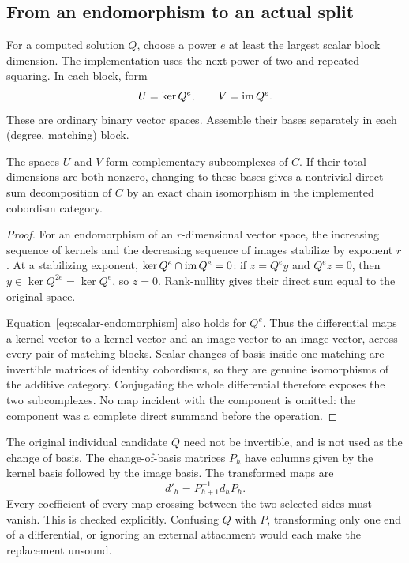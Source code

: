 \subsection{From an endomorphism to an actual split}
For a computed solution $Q$, choose a power $e$ at least the largest scalar
block dimension. The implementation uses the next power of two and repeated
squaring. In each block, form
\[
 U=\ker Q^e,\qquad V=\operatorname{im} Q^e.
\]
These are ordinary binary vector spaces. Assemble their bases separately in
each (degree, matching) block.

\begin{theorem}\label{thm:fitting}
The spaces $U$ and $V$ form complementary subcomplexes of $C$. If their total
dimensions are both nonzero, changing to these bases gives a nontrivial
direct-sum decomposition of $C$ by an exact chain isomorphism in the
implemented cobordism category.
\end{theorem}
\begin{proof}
For an endomorphism of an $r$-dimensional vector space, the increasing sequence
of kernels and the decreasing sequence of images stabilize by exponent $r$.
At a stabilizing exponent, $\ker Q^e\cap\operatorname{im} Q^e=0$: if $z=Q^ey$ and
$Q^ez=0$, then $y\in\ker Q^{2e}=\ker Q^e$, so $z=0$. Rank-nullity gives
their direct sum equal to the original space.

Equation~\eqref{eq:scalar-endomorphism} also holds for $Q^e$. Thus the
differential maps a kernel vector to a kernel vector and an image vector to
an image vector, across every pair of matching blocks. Scalar changes of
basis inside one matching are invertible matrices of identity cobordisms,
so they are genuine isomorphisms of the additive category. Conjugating the
whole differential therefore exposes the two subcomplexes. No map incident
with the component is omitted: the component was a complete direct summand
before the operation.
\end{proof}

The original individual candidate $Q$ need not be invertible, and is not
used as the change of basis. The change-of-basis matrices $P_h$ have columns
given by the kernel basis followed by the image basis. The transformed maps
are
\begin{equation}\label{eq:conjugation}
 d'_h=P_{h+1}^{-1}d_hP_h.
\end{equation}
Every coefficient of every map crossing between the two selected sides must
vanish. This is checked explicitly. Confusing $Q$ with $P$, transforming only
one end of a differential, or ignoring an external attachment would each
make the replacement unsound.

